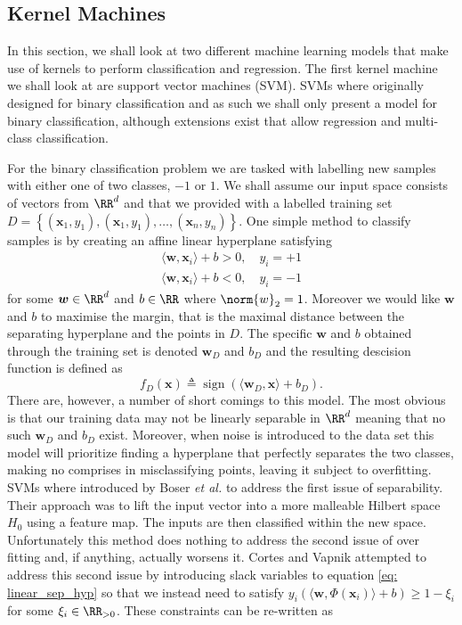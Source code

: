 \subsection{Kernel Machines}\label{Section1.4}

In this section, we shall look at two different machine learning models that make use of kernels to perform classification and regression. The first kernel machine we shall look at are support vector machines (SVM). SVMs where originally designed for binary classification and as such we shall only present a model for binary classification, although extensions exist that allow regression and multi-class classification.

For the binary classification problem we are tasked with labelling new samples with either one of two classes, $-1$ or $1$. We shall assume our input space consists of vectors from $\RR^d$ and that we provided with a labelled training set $D = \left\{ \left( \bm{x}_1 , y_1 \right), \left( \bm{x}_1 , y_1 \right), \ldots , \left( \bm{x}_n , y_n \right) \right\}$. One simple method to classify samples is by creating an affine linear hyperplane satisfying
\begin{align} \label{eq: linear_sep_hyp}
    \langle \bm{w}, \bm{x}_i \rangle + b > 0, \quad y_i = +1 \nonumber \\
    \langle \bm{w}, \bm{x}_i \rangle + b < 0, \quad y_i = -1
\end{align}
for some $\bm{w} \in \RR^d$ and $b \in \RR$ where $\norm{w}_2 = 1$. Moreover we would like $\bm{w}$ and $b$ to maximise the margin, that is the maximal distance between the separating hyperplane and the points in $D$. The specific $\bm{w}$ and $b$ obtained through the training set is denoted $\bm{w}_D$ and $b_D$ and the resulting descision function is defined as
\[
    f_D \left( \bm{x} \right) \triangleq \operatorname{sign} \left( \langle \bm{w}_D , \bm{x} \rangle + b_D \right).
\]
There are, however, a number of short comings to this model. The most obvious is that our training data may not be linearly separable in $\RR^d$ meaning that no such $\bm{w}_D$ and $b_D$ exist. Moreover, when noise is introduced to the data set this model will prioritize finding a hyperplane that perfectly separates the two classes, making no comprises in misclassifying points, leaving it subject to overfitting. SVMs where introduced by Boser {\it et al.} \cite{BoserBernhard1992Ataf} to address the first issue of separability. Their approach was to lift the input vector into a more malleable Hilbert space $H_0$ using a feature map. The inputs are then classified within the new space. Unfortunately this method does nothing to address the second issue of over fitting and, if anything, actually worsens it. Cortes and Vapnik \cite{CortesCorinna1995SN} attempted to address this second issue by introducing slack variables to equation \ref{eq: linear_sep_hyp} so that we instead need to satisfy $y_i \left( \langle \bm{w} , \Phi \left( \bm{x}_i \right) \rangle + b \right) \geq 1 - \xi_i$ for some $\xi_i \in \RR_{>0}$. These constraints can be re-written as
